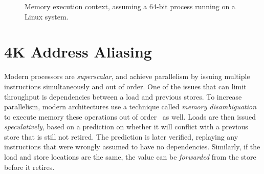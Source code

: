 \documentclass[10pt, conference, compsocconf]{IEEEtran}
\begin{document}
\begin{figure}
  \centering
  \caption{Memory execution context, assuming a 64-bit process running on a Linux system.}
  \label{fig:virtualmemory}
\end{figure}


\section{4K Address Aliasing}
\label{sec:aliasing}
Modern processors are \emph{superscalar}, and achieve parallelism by issuing multiple instructions simultaneously and out of order.
One of the issues that can limit throughput is dependencies between a load and previous stores.
To increase parallelism, modern architectures use a technique called \emph{memory disambiguation} to execute memory these operations out of order~\cite{Intel:2006:InsideICM:SmartMemoryAccess} as well. 
Loads are then issued \emph{speculatively}, based on a prediction on whether it will conflict with a previous store that is still not retired.
The prediction is later verified, replaying any instructions that were wrongly assumed to have no dependencies.
Similarly, if the load and store locations are the same, the value can be \emph{forwarded} from the store before it retires.
\end{document}
